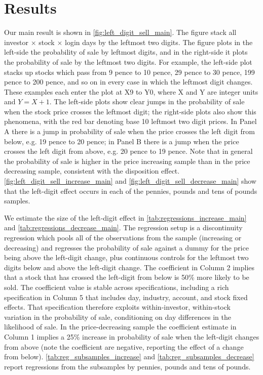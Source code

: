 \section{Results}

Our main result is shown in \ref{fig:left_digit_sell_main}. The figure stack all investor $\times$ stock $\times$ login days by the leftmost two digits. The figure plots in the left-side the probability of sale by leftmost digits, and in the right-side it plots the probability of sale by the leftmost two digits. For example, the left-side plot stacks up stocks which pass from 9 pence to 10 pence, 29 pence to 30 pence, 199 pence to 200 pence, and so on in every case in which the leftmost digit changes. These examples each enter the plot at X9 to Y0, where X and Y are integer units and $Y = X + 1$. The left-side plots show clear jumps in the probability of sale when the stock price crosses the leftmost digit; the right-side plots also show this phenomena, with the red bar denoting base 10 leftmost two digit prices. In Panel A there is a jump in probability of sale when the price crosses the left digit from below, e.g. 19 pence to 20 pence; in Panel B there is a jump when the price crosses the left digit from above, e.g. 20 pence to 19 pence. Note that in general the probability of sale is higher in the price increasing sample than in the price decreasing sample, consistent with the disposition effect. \ref{fig:left_digit_sell_increase_main} and \ref{fig:left_digit_sell_decrease_main} show that the left-digit effect occurs in each of the pennies, pounds and tens of pounds samples.

We estimate the size of the left-digit effect in \ref{tab:regressions_increase_main} and \ref{tab:regressions_decrease_main}. The regression setup is a discontinuity regression which pools all of the observations from the sample (increasing or decreasing) and regresses the probability of sale against a dummy for the price being above the left-digit change, plus continuous controls for the leftmost two digits below and above the left-digit change. The coefficient in Column 2 implies that a stock that has crossed the left-digit from below is 50\% more likely to be sold. The coefficient value is stable across specifications, including a rich specification in Column 5 that includes day, industry, account, and stock fixed effects. That specification therefore exploits within-investor, within-stock variation in the probability of sale, conditioning on day differences in the likelihood of sale. In the price-decreasing sample the coefficient estimate in Column 1 implies a 25\% increase in probability of sale when the left-digit changes from above (note the coefficient are negative, reporting the effect of a change from below). \ref{tab:reg_subsamples_increase} and \ref{tab:reg_subsamples_decrease} report regressions from the subsamples by pennies, pounds and tens of pounds.

